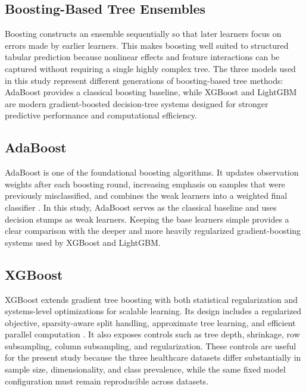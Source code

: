 \subsection{Boosting-Based Tree Ensembles}
\label{subsec:rw_boosting}

Boosting constructs an ensemble sequentially so that later learners focus on
errors made by earlier learners. This makes boosting well suited to structured
tabular prediction because nonlinear effects and feature interactions can be
captured without requiring a single highly complex tree. The three models used
in this study represent different generations of boosting-based tree methods:
AdaBoost provides a classical boosting baseline, while XGBoost and LightGBM are
modern gradient-boosted decision-tree systems designed for stronger predictive
performance and computational efficiency.

\subsection{AdaBoost}
\label{subsec:rw_adaboost}

AdaBoost is one of the foundational boosting algorithms. It updates observation
weights after each boosting round, increasing emphasis on samples that were
previously misclassified, and combines the weak learners into a weighted final
classifier \cite{freund1997adaboost}. In this study, AdaBoost serves as the
classical baseline and uses decision stumps as weak learners. Keeping the base
learners simple provides a clear comparison with the deeper and more heavily
regularized gradient-boosting systems used by XGBoost and LightGBM.

\subsection{XGBoost}
\label{subsec:rw_xgboost}

XGBoost extends gradient tree boosting with both statistical regularization and
systems-level optimizations for scalable learning. Its design includes a
regularized objective, sparsity-aware split handling, approximate tree learning,
and efficient parallel computation \cite{chen2016xgboost}. It also exposes
controls such as tree depth, shrinkage, row subsampling, column subsampling, and
regularization. These controls are useful for the present study because the
three healthcare datasets differ substantially in sample size, dimensionality,
and class prevalence, while the same fixed model configuration must remain
reproducible across datasets.

